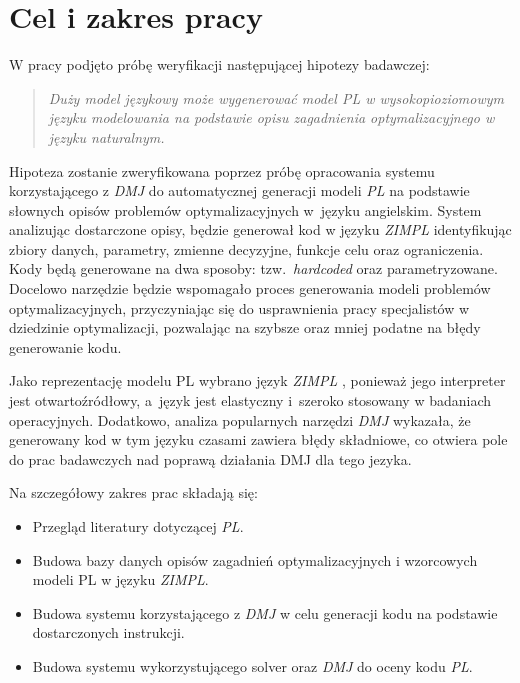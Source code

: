 
\section{Cel i zakres pracy}\label{sec:intro:aim}

W pracy podjęto próbę weryfikacji następującej hipotezy badawczej:
\begin{quote}
\textit{Duży model językowy może wygenerować model PL w wysokopioziomowym języku modelowania na podstawie opisu zagadnienia optymalizacyjnego w języku naturalnym.}
\end{quote}


Hipoteza zostanie zweryfikowana poprzez próbę opracowania systemu korzystającego z \textit{DMJ} do automatycznej generacji modeli \textit{PL} na podstawie słownych opisów problemów optymalizacyjnych w~języku angielskim. System analizując dostarczone opisy, będzie generował kod w języku \textit{ZIMPL} identyfikując zbiory danych, parametry, zmienne decyzyjne, funkcje celu oraz ograniczenia. Kody będą generowane na dwa sposoby: tzw.~\textit{hardcoded} oraz parametryzowane. Docelowo narzędzie będzie wspomagało proces generowania modeli problemów optymalizacyjnych, przyczyniając się do usprawnienia pracy specjalistów w dziedzinie optymalizacji, pozwalając na szybsze oraz mniej podatne na błędy generowanie kodu.

Jako reprezentację modelu PL wybrano język \textit{ZIMPL} \cite{zimpl_manual}, ponieważ jego interpreter jest otwartoźródłowy, a~język jest elastyczny i~szeroko stosowany w badaniach operacyjnych. Dodatkowo, analiza popularnych narzędzi \textit{DMJ} wykazała, że generowany kod w tym języku czasami zawiera błędy składniowe, co otwiera pole do prac badawczych nad poprawą działania DMJ dla tego jezyka.

Na szczegółowy zakres prac składają się:
\begin{itemize}
    \item Przegląd literatury dotyczącej \textit{PL}.
    \item Budowa bazy danych opisów zagadnień optymalizacyjnych i wzorcowych modeli PL w języku \textit{ZIMPL}.
    \item Budowa systemu korzystającego z \textit{DMJ} w celu generacji kodu na podstawie dostarczonych instrukcji.
    \item Budowa systemu wykorzystującego solver oraz \textit{DMJ} do oceny kodu \textit{PL}.
\end{itemize}



